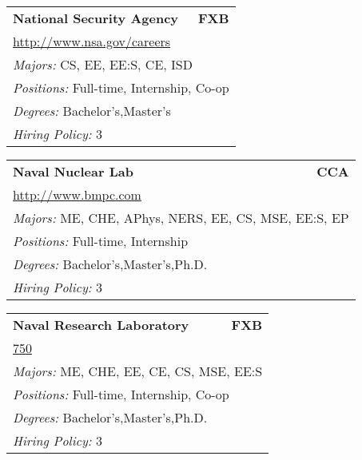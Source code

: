 \documentclass[twoside]{article}
\begin{document}
\begin{center}
\begin{multicols}{3}
\begin{FlushLeft}
\begin{minipage}{.9\columnwidth}
\end{minipage}
 
\begin{minipage}{.9\columnwidth}\begin{tabularx}{.95\columnwidth}{Xr}
                 {\Large\bf National Security Agency} & {\Large\bf FXB}\\
    \multicolumn{2}{p{.95\columnwidth}}{\url{http://www.nsa.gov/careers}}\\
    \multicolumn{2}{p{.95\columnwidth}}{\emph{Majors:} CS, EE, EE:S, CE, ISD}\\
    \multicolumn{2}{p{.95\columnwidth}}{\emph{Positions:} Full-time, Internship, Co-op}\\
    \multicolumn{2}{p{.95\columnwidth}}{\emph{Degrees:} Bachelor's,Master's}\\
    \multicolumn{2}{p{.95\columnwidth}}{\emph{Hiring Policy:} 3}\\
    \end{tabularx}
    
\end{minipage}
 
\begin{minipage}{.9\columnwidth}\begin{tabularx}{.95\columnwidth}{Xr}
                 {\Large\bf Naval Nuclear Lab} & {\Large\bf CCA}\\
    \multicolumn{2}{p{.95\columnwidth}}{\url{http://www.bmpc.com}}\\
    \multicolumn{2}{p{.95\columnwidth}}{\emph{Majors:} ME, CHE, APhys, NERS, EE, CS, MSE, EE:S, EP}\\
    \multicolumn{2}{p{.95\columnwidth}}{\emph{Positions:} Full-time, Internship}\\
    \multicolumn{2}{p{.95\columnwidth}}{\emph{Degrees:} Bachelor's,Master's,Ph.D.}\\
    \multicolumn{2}{p{.95\columnwidth}}{\emph{Hiring Policy:} 3}\\
    \end{tabularx}
    
\end{minipage}
 
\begin{minipage}{.9\columnwidth}\begin{tabularx}{.95\columnwidth}{Xr}
                 {\Large\bf Naval Research Laboratory} & {\Large\bf FXB}\\
    \multicolumn{2}{p{.95\columnwidth}}{\url{750}}\\
    \multicolumn{2}{p{.95\columnwidth}}{\emph{Majors:} ME, CHE, EE, CE, CS, MSE, EE:S}\\
    \multicolumn{2}{p{.95\columnwidth}}{\emph{Positions:} Full-time, Internship, Co-op}\\
    \multicolumn{2}{p{.95\columnwidth}}{\emph{Degrees:} Bachelor's,Master's,Ph.D.}\\
    \multicolumn{2}{p{.95\columnwidth}}{\emph{Hiring Policy:} 3}\\
    \end{tabularx}
    

\end{minipage}
\end{FlushLeft}
\end{multicols}
\end{center}
\end{document}
